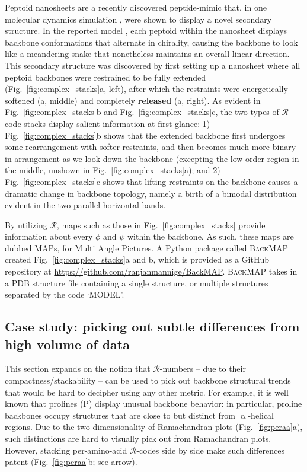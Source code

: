 \documentclass[fleqn,10pt,lineno]{wlpeerj} %
\newcommand{\Fig}[1]{Fig.~\ref{#1}}
\newcommand{\n}[1]{{\textbf{\color{red}#1}}}
\newcommand{\gname}{BackMAP}
\newcommand{\pname}{\textsc{\gname}\xspace}
\newcommand{\rr}{$\mathcal{R}$\xspace}
\begin{document}
Peptoid nanosheets are a recently discovered peptide-mimic that, in one molecular dynamics simulation \citep{Mannige2015}, were shown to display a novel secondary structure. In the reported model \citep{Mannige2015}, each peptoid within the nanosheet displays backbone conformations that alternate in chirality, causing the backbone to look like a meandering snake that nonetheless maintains an overall linear direction. This secondary structure was discovered by first setting up a nanosheet where all peptoid backbones were restrained to be fully extended (\Fig{fig:complex_stacks}a, left), after which the restraints were energetically softened (a, middle) and completely \n{released} (a, right). As evident in \Fig{fig:complex_stacks}b and \Fig{fig:complex_stacks}c, the two types of \rr-code stacks display salient information at first glance: 1) \Fig{fig:complex_stacks}b shows that the extended backbone first undergoes some rearrangement with softer restraints, and then becomes much more binary in arrangement as we look down the backbone (excepting the low-order region in the middle, unshown in \Fig{fig:complex_stacks}a); and 2) \Fig{fig:complex_stacks}c shows that lifting restraints on the backbone causes a dramatic change in backbone topology, namely a birth of a bimodal distribution evident in the two parallel horizontal bands.

By utilizing \rr, maps such as those in \Fig{fig:complex_stacks} provide information about every $\phi$ and $\psi$ within the backbone. As such, these maps are dubbed MAPs, for Multi Angle Pictures. A Python package called \pname created \Fig{fig:complex_stacks}a and b, which is provided as a GitHub repository at \url{https://github.com/ranjanmannige/\gname}. \pname takes in a PDB structure file containing a single structure, or multiple structures separated by the code `MODEL'.

\subsection*{Case study: picking out subtle differences from high volume of data}

This section expands on the notion that \rr-numbers -- due to their compactness/stackability -- can be used to pick out backbone structural trends that would be hard to decipher using any other metric. For example, it is well known that prolines (P) display unusual backbone behavior: in particular, proline backbones occupy structures that are close to but distinct from $\upalpha$-helical regions. Due to the two-dimensionality of Ramachandran plots (\Fig{fig:peraa}a), such distinctions are hard to visually pick out from Ramachandran plots. However, stacking per-amino-acid \rr-codes side by side make such differences patent (\Fig{fig:peraa}b; see arrow).
\end{document}
